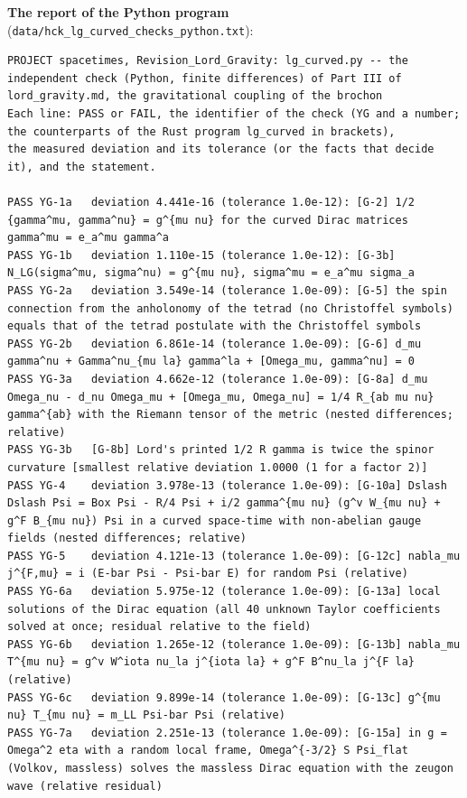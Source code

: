 \documentclass[
  10pt,
]{article}
\begin{document}
\textbf{The report of the Python program}
(\texttt{data/hck\_lg\_curved\_checks\_python.txt}):

\begin{verbatim}
PROJECT spacetimes, Revision_Lord_Gravity: lg_curved.py -- the independent check (Python, finite differences) of Part III of lord_gravity.md, the gravitational coupling of the brochon
Each line: PASS or FAIL, the identifier of the check (YG and a number; the counterparts of the Rust program lg_curved in brackets),
the measured deviation and its tolerance (or the facts that decide it), and the statement.

PASS YG-1a   deviation 4.441e-16 (tolerance 1.0e-12): [G-2] 1/2 {gamma^mu, gamma^nu} = g^{mu nu} for the curved Dirac matrices gamma^mu = e_a^mu gamma^a
PASS YG-1b   deviation 1.110e-15 (tolerance 1.0e-12): [G-3b] N_LG(sigma^mu, sigma^nu) = g^{mu nu}, sigma^mu = e_a^mu sigma_a
PASS YG-2a   deviation 3.549e-14 (tolerance 1.0e-09): [G-5] the spin connection from the anholonomy of the tetrad (no Christoffel symbols) equals that of the tetrad postulate with the Christoffel symbols
PASS YG-2b   deviation 6.861e-14 (tolerance 1.0e-09): [G-6] d_mu gamma^nu + Gamma^nu_{mu la} gamma^la + [Omega_mu, gamma^nu] = 0
PASS YG-3a   deviation 4.662e-12 (tolerance 1.0e-09): [G-8a] d_mu Omega_nu - d_nu Omega_mu + [Omega_mu, Omega_nu] = 1/4 R_{ab mu nu} gamma^{ab} with the Riemann tensor of the metric (nested differences; relative)
PASS YG-3b   [G-8b] Lord's printed 1/2 R gamma is twice the spinor curvature [smallest relative deviation 1.0000 (1 for a factor 2)]
PASS YG-4    deviation 3.978e-13 (tolerance 1.0e-09): [G-10a] Dslash Dslash Psi = Box Psi - R/4 Psi + i/2 gamma^{mu nu} (g^v W_{mu nu} + g^F B_{mu nu}) Psi in a curved space-time with non-abelian gauge fields (nested differences; relative)
PASS YG-5    deviation 4.121e-13 (tolerance 1.0e-09): [G-12c] nabla_mu j^{F,mu} = i (E-bar Psi - Psi-bar E) for random Psi (relative)
PASS YG-6a   deviation 5.975e-12 (tolerance 1.0e-09): [G-13a] local solutions of the Dirac equation (all 40 unknown Taylor coefficients solved at once; residual relative to the field)
PASS YG-6b   deviation 1.265e-12 (tolerance 1.0e-09): [G-13b] nabla_mu T^{mu nu} = g^v W^iota nu_la j^{iota la} + g^F B^nu_la j^{F la} (relative)
PASS YG-6c   deviation 9.899e-14 (tolerance 1.0e-09): [G-13c] g^{mu nu} T_{mu nu} = m_LL Psi-bar Psi (relative)
PASS YG-7a   deviation 2.251e-13 (tolerance 1.0e-09): [G-15a] in g = Omega^2 eta with a random local frame, Omega^{-3/2} S Psi_flat (Volkov, massless) solves the massless Dirac equation with the zeugon wave (relative residual)

\end{verbatim}
\end{document}
